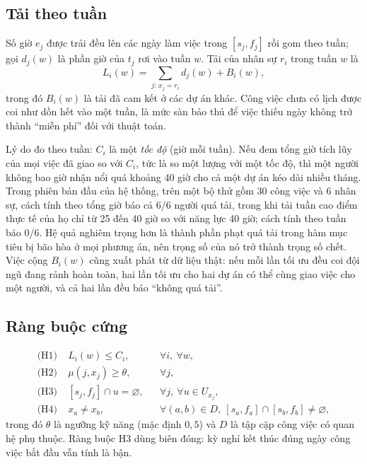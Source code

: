 \documentclass{IEEEtran}
\begin{document}
\subsection{Tải theo tuần}

Số giờ $e_j$ được trải đều lên các ngày làm việc trong $[s_j,f_j]$ rồi gom theo tuần; gọi $d_j(w)$ là phần giờ của $t_j$ rơi vào tuần $w$. Tải của nhân sự $r_i$ trong tuần $w$ là
\begin{equation}
L_i(w)=\sum_{j:\,x_j=r_i} d_j(w) + B_i(w),
\label{eq:load}
\end{equation}
trong đó $B_i(w)$ là tải đã cam kết ở các dự án khác. Công việc chưa có lịch được coi như dồn hết vào một tuần, là mức sàn bảo thủ để việc thiếu ngày không trở thành ``miễn phí'' đối với thuật toán.

Lý do đo theo tuần: $C_i$ là một \emph{tốc độ} (giờ mỗi tuần). Nếu đem tổng giờ tích lũy của mọi việc đã giao so với $C_i$, tức là so một lượng với một tốc độ, thì một người không bao giờ nhận nổi quá khoảng 40 giờ cho cả một dự án kéo dài nhiều tháng. Trong phiên bản đầu của hệ thống, trên một bộ thử gồm 30 công việc và 6 nhân sự, cách tính theo tổng giờ báo cả 6/6 người quá tải, trong khi tải tuần cao điểm thực tế của họ chỉ từ 25 đến 40 giờ so với năng lực 40 giờ; cách tính theo tuần báo 0/6. Hệ quả nghiêm trọng hơn là thành phần phạt quá tải trong hàm mục tiêu bị bão hòa ở mọi phương án, nên trọng số của nó trở thành trọng số chết. Việc cộng $B_i(w)$ cũng xuất phát từ dữ liệu thật: nếu mỗi lần tối ưu đều coi đội ngũ đang rảnh hoàn toàn, hai lần tối ưu cho hai dự án có thể cùng giao việc cho một người, và cả hai lần đều báo ``không quá tải''.

\subsection{Ràng buộc cứng}

\begin{align}
\text{(H1)}\;& L_i(w)\le C_i, && \forall i,\ \forall w,\\
\text{(H2)}\;& \mu(j,x_j)\ge\theta, && \forall j,\\
\text{(H3)}\;& [s_j,f_j]\cap u=\varnothing, && \forall j,\ \forall u\in U_{x_j},\\
\text{(H4)}\;& x_a\ne x_b, && \forall (a,b)\in D,\ [s_a,f_a]\cap[s_b,f_b]\ne\varnothing,
\end{align}
trong đó $\theta$ là ngưỡng kỹ năng (mặc định $0{,}5$) và $D$ là tập cặp công việc có quan hệ phụ thuộc. Ràng buộc H3 dùng biên đóng: kỳ nghỉ kết thúc đúng ngày công việc bắt đầu vẫn tính là bận.
\end{document}
